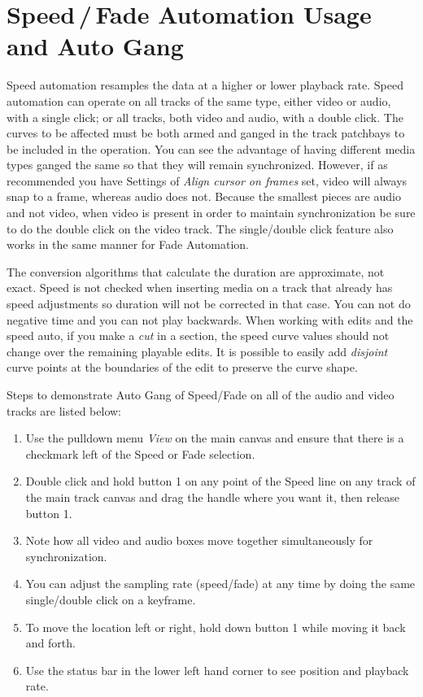 \section{Speed\,/\,Fade Automation Usage and Auto Gang}%
\label{sec:speed_fade_automation_gang}

Speed automation resamples the data at a higher or lower playback rate. Speed automation can operate
on all tracks of the same type, either video or audio, with a single click; or all tracks, both video and
audio, with a double click. The curves to be affected must be both armed and ganged in the track
patchbays to be included in the operation. You can see the advantage of having different media types
ganged the same so that they will remain synchronized.  However, if as recommended you have Settings of \textit{Align cursor on frames} set, video will always snap to a frame, whereas audio does not.  Because the smallest pieces are audio and not video, when video is present in order to maintain synchronization be sure to do the double click on the video track.  The single/double click feature also works in the same manner for Fade Automation.

The conversion algorithms that calculate the duration are approximate, not exact.   Speed is not checked when inserting media on a track that already has speed adjustments so duration will not be corrected in that case.  You can not do negative time and you can not play backwards.  When working with edits and the speed auto, if you make a \textit{cut} in a section, the speed curve values should not change over the remaining playable edits.  It is
possible to easily add \textit{disjoint} curve points at the boundaries of the edit to preserve the curve shape.

Steps to demonstrate Auto Gang of Speed/Fade on all of the audio and video tracks are listed below:

\begin{enumerate}
    \item Use the pulldown menu \textit{View} on the main canvas and ensure that there is a checkmark left of the Speed or Fade selection.
    \item Double click and hold button 1 on any point of the Speed line on any track of the main track canvas and drag the handle where you want it, then release button 1.
    \item Note how all video and audio boxes move together simultaneously for synchronization.
    \item You can adjust the sampling rate (speed/fade) at any time by doing the same single/double
    click on a keyframe.
    \item To move the location left or right, hold down button 1 while moving it back and forth.
    \item Use the status bar in the lower left hand corner to see position and playback rate.
\end{enumerate}

